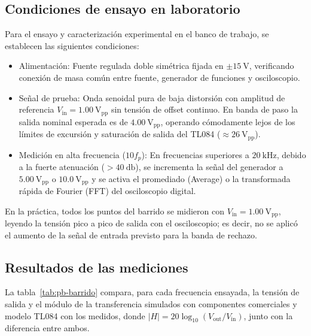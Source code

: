 \subsection{Condiciones de ensayo en laboratorio}
\label{subsec:pb-condiciones}

Para el ensayo y caracterización experimental en el banco de trabajo, se establecen las siguientes condiciones:
\begin{itemize}
  \item Alimentación: Fuente regulada doble simétrica fijada en $\pm\SI{15}{\volt}$, verificando conexión de masa
    común entre fuente, generador de funciones y osciloscopio.
  \item Señal de prueba: Onda senoidal pura de baja distorsión con amplitud de referencia
    $V_{\text{in}} = \SI{1.00}{\volt_{\text{pp}}}$ sin tensión de offset continuo. En banda de paso la salida nominal
    esperada es de $\SI{4.00}{\volt_{\text{pp}}}$, operando cómodamente lejos de los límites de excursión y saturación
    de salida del TL084 ($\approx \SI{26}{\volt_{\text{pp}}}$).
  \item Medición en alta frecuencia ($10 f_p$): En frecuencias superiores a $\SI{20}{\kilo\hertz}$, debido a la fuerte
    atenuación ($> \SI{40}{\decibel}$), se incrementa la señal del generador a $\SI{5.00}{\volt_{\text{pp}}}$ o
    $\SI{10.0}{\volt_{\text{pp}}}$ y se activa el promediado (Average) o la transformada rápida de Fourier (FFT) del
    osciloscopio digital.
\end{itemize}

En la práctica, todos los puntos del barrido se midieron con $V_{\text{in}} = \SI{1.00}{\volt_{\text{pp}}}$, leyendo
la tensión pico a pico de salida con el osciloscopio; es decir, no se aplicó el aumento de la señal de entrada
previsto para la banda de rechazo.

\subsection{Resultados de las mediciones}
\label{subsec:pb-tabla-visado}

La tabla~\ref{tab:pb-barrido} compara, para cada frecuencia ensayada, la tensión de salida y el módulo de la transferencia
simulados con componentes comerciales y modelo TL084 con los medidos, donde
$|H| = 20 \log_{10} \left( V_{\text{out}} / V_{\text{in}} \right)$, junto con la diferencia entre ambos.

